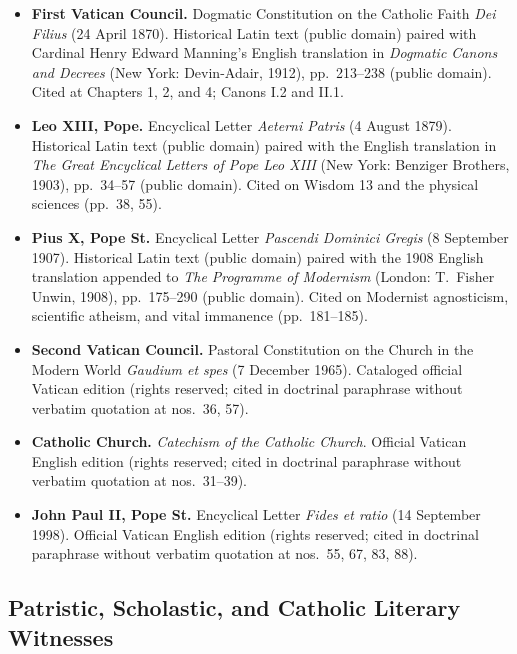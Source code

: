 \begin{itemize}
\item \textbf{First Vatican Council.} Dogmatic Constitution on the Catholic Faith \emph{Dei Filius} (24 April 1870). Historical Latin text (public domain) paired with Cardinal Henry Edward Manning's English translation in \emph{Dogmatic Canons and Decrees} (New York: Devin-Adair, 1912), pp.~213--238 (public domain). Cited at Chapters 1, 2, and 4; Canons I.2 and II.1.
\item \textbf{Leo XIII, Pope.} Encyclical Letter \emph{Aeterni Patris} (4 August 1879). Historical Latin text (public domain) paired with the English translation in \emph{The Great Encyclical Letters of Pope Leo XIII} (New York: Benziger Brothers, 1903), pp.~34--57 (public domain). Cited on Wisdom 13 and the physical sciences (pp.~38, 55).
\item \textbf{Pius X, Pope St.} Encyclical Letter \emph{Pascendi Dominici Gregis} (8 September 1907). Historical Latin text (public domain) paired with the 1908 English translation appended to \emph{The Programme of Modernism} (London: T.\ Fisher Unwin, 1908), pp.~175--290 (public domain). Cited on Modernist agnosticism, scientific atheism, and vital immanence (pp.~181--185).
\item \textbf{Second Vatican Council.} Pastoral Constitution on the Church in the Modern World \emph{Gaudium et spes} (7 December 1965). Cataloged official Vatican edition (rights reserved; cited in doctrinal paraphrase without verbatim quotation at nos.\ 36, 57).
\item \textbf{Catholic Church.} \emph{Catechism of the Catholic Church}. Official Vatican English edition (rights reserved; cited in doctrinal paraphrase without verbatim quotation at nos.\ 31--39).
\item \textbf{John Paul II, Pope St.} Encyclical Letter \emph{Fides et ratio} (14 September 1998). Official Vatican English edition (rights reserved; cited in doctrinal paraphrase without verbatim quotation at nos.\ 55, 67, 83, 88).
\end{itemize}

\subsection*{Patristic, Scholastic, and Catholic Literary Witnesses}

